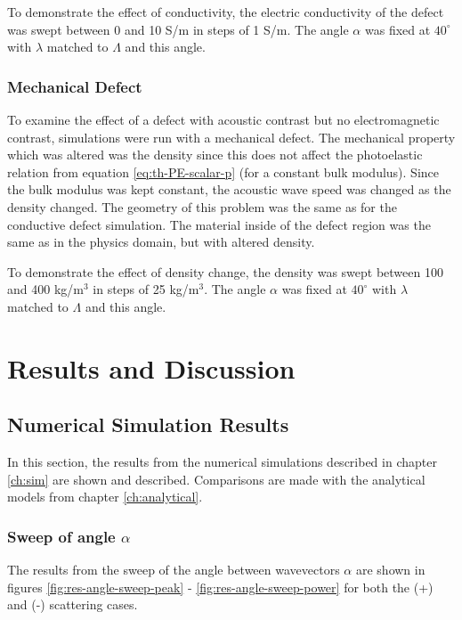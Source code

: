 \documentclass[11pt,twoside]{eitExjobb}
\begin{document}
	To demonstrate the effect of conductivity, the electric conductivity of the defect was swept between 0 and 10 S/m in steps of 1 S/m. The angle $\alpha$ was fixed at $40^\circ$ with $\lambda$ matched to $\Lambda$ and this angle.
	
	\subsection{Mechanical Defect}
	To examine the effect of a defect with acoustic contrast but no electromagnetic contrast, simulations were run with a mechanical defect. The mechanical property which was altered was the density since this does not affect the photoelastic relation from equation \eqref{eq:th-PE-scalar-p} (for a constant bulk modulus). Since the bulk modulus was kept constant, the acoustic wave speed was changed as the density changed. The geometry of this problem was the same as for the conductive defect simulation. The material inside of the defect region was the same as in the physics domain, but with altered density.
	
	To demonstrate the effect of density change, the density was swept between 100 and 400 kg/m$^3$ in steps of 25 kg/m$^3$. The angle $\alpha$ was fixed at $40^\circ$ with $\lambda$ matched to $\Lambda$ and this angle.
	
	\chapter{Results and Discussion} \label{ch:res-disc}
	
	\section{Numerical Simulation Results}
	In this section, the results from the numerical simulations described in chapter \ref{ch:sim} are shown and described. Comparisons are made with the analytical models from chapter \ref{ch:analytical}.
	
	\subsection{Sweep of angle $\alpha$}
	The results from the sweep of the angle between wavevectors $\alpha$ are shown in figures \ref{fig:res-angle-sweep-peak} - \ref{fig:res-angle-sweep-power} for both the (+) and (-) scattering cases.
	
\end{document}
